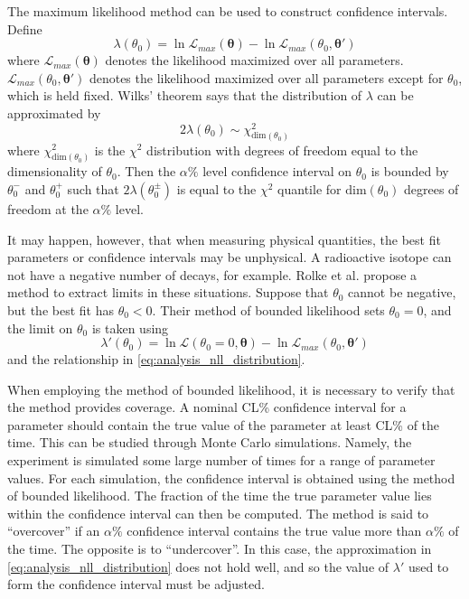 \documentclass[herrin-thesis.tex]{subfiles}
\begin{document}
The maximum likelihood method can be used to construct confidence intervals. Define
\begin{equation}
\lambda({\theta_0}) = \ln \mathcal{L}_{max}(\boldsymbol{\theta}) - \ln \mathcal{L}_{max}(\theta_0, \boldsymbol{\theta}')
\end{equation}
where \(\mathcal{L}_{max}(\boldsymbol{\theta})\) denotes the likelihood maximized over all parameters. \(\mathcal{L}_{max}(\theta_0, \boldsymbol{\theta}')\) denotes the likelihood maximized over all parameters except for \(\theta_0\), which is held fixed. Wilks' theorem\cite{Wilks:1938uq} says that the distribution of \(\lambda\) can be approximated by
\begin{equation}
2\lambda(\theta_0) \sim \chi^2_{\text{dim}(\theta_0)}
\label{eq:analysis_nll_distribution}
\end{equation}
where \(\chi^2_{\text{dim}(\theta_0)}\) is the \(\chi^2\) distribution with degrees of freedom equal to the dimensionality of \(\theta_0\). Then the \(\alpha\%\) level confidence interval on \(\theta_0\) is bounded by \(\theta_0^-\) and \(\theta_0^+\) such that \(2\lambda(\theta_0^\pm)\) is equal to the \(\chi^2\) quantile for \(\text{dim}(\theta_0)\) degrees of freedom at the \(\alpha\%\) level.

It may happen, however, that when measuring physical quantities, the best fit parameters or confidence intervals may be unphysical. A radioactive isotope can not have a negative number of decays, for example. Rolke et al.\cite{Rolke:2005uq} propose a method to extract limits in these situations. Suppose that \(\theta_0\) cannot be negative, but the best fit has \(\theta_0 < 0\). Their method of bounded likelihood sets \(\theta_0 = 0\), and the limit on \(\theta_0\) is taken using
\begin{equation}
\lambda'({\theta_0}) = \ln \mathcal{L}(\theta_0 = 0, \boldsymbol{\theta}) - \ln \mathcal{L}_{max}(\theta_0, \boldsymbol{\theta}')
\end{equation}
and the relationship in \cref{eq:analysis_nll_distribution}.

When employing the method of bounded likelihood, it is necessary to verify that the method provides coverage. A nominal CL\% confidence interval for a parameter should contain the true value of the parameter at least CL\% of the time. This can be studied through Monte Carlo simulations. Namely, the experiment is simulated some large number of times for a range of parameter values. For each simulation, the confidence interval is obtained using the method of bounded likelihood. The fraction of the time the true parameter value lies within the confidence interval can then be computed. The method is said to ``overcover'' if an \(\alpha\%\) confidence interval contains the true value more than \(\alpha\%\) of the time. The opposite is to ``undercover''. In this case, the approximation in \cref{eq:analysis_nll_distribution} does not hold well, and so the value of \(\lambda'\) used to form the confidence interval must be adjusted.
\end{document}
